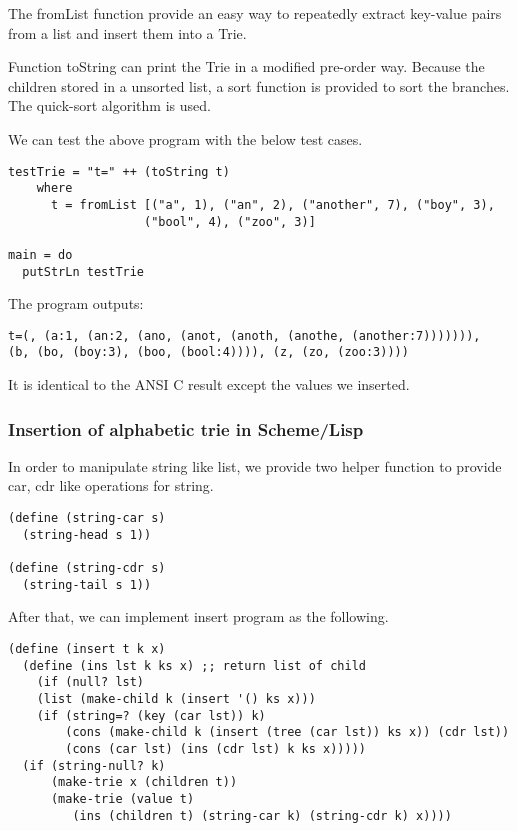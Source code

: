 \documentclass{article}
\begin{document}
The fromList function provide an easy way to repeatedly extract
key-value pairs from a list and insert them into a Trie.

Function toString can print the Trie in a modified pre-order way.
Because the children stored in a unsorted list, a sort function is
provided to sort the branches. The quick-sort algorithm is used.

We can test the above program with the below test cases.

\begin{lstlisting}
testTrie = "t=" ++ (toString t)
    where 
      t = fromList [("a", 1), ("an", 2), ("another", 7), ("boy", 3), 
                   ("bool", 4), ("zoo", 3)]

main = do
  putStrLn testTrie
\end{lstlisting}

The program outputs:

\begin{verbatim}
t=(, (a:1, (an:2, (ano, (anot, (anoth, (anothe, (another:7))))))), 
(b, (bo, (boy:3), (boo, (bool:4)))), (z, (zo, (zoo:3))))
\end{verbatim}

It is identical to the ANSI C result except the values we inserted.

\subsubsection*{Insertion of alphabetic trie in Scheme/Lisp}

In order to manipulate string like list, we provide two helper
function to provide car, cdr like operations for string.

\lstset{language=lisp}
\begin{lstlisting}
(define (string-car s)
  (string-head s 1))

(define (string-cdr s)
  (string-tail s 1))
\end{lstlisting}

After that, we can implement insert program as the following.

\begin{lstlisting}
(define (insert t k x)
  (define (ins lst k ks x) ;; return list of child
    (if (null? lst)
	(list (make-child k (insert '() ks x)))
	(if (string=? (key (car lst)) k)
	    (cons (make-child k (insert (tree (car lst)) ks x)) (cdr lst))
	    (cons (car lst) (ins (cdr lst) k ks x)))))
  (if (string-null? k) 
      (make-trie x (children t))
      (make-trie (value t) 
		 (ins (children t) (string-car k) (string-cdr k) x))))
\end{lstlisting}
\end{document}
